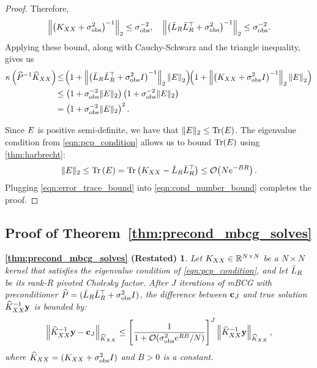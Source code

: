 \begin{proof}
  Therefore,
  \[
    \left\Vert \left(K_{XX} + \sigma^2_\text{obs} \right)^{-1} \right\Vert_2 \leq \sigma^{-2}_\text{obs},
    \quad
    \left\Vert \left(\bar{L}_R \bar{L}_R^\top + \sigma^2_\text{obs} \right)^{-1} \right\Vert_2 \leq \sigma^{-2}_\text{obs}.
  \]
  Applying these bound, along with Cauchy-Schwarz and the triangle inequality, gives us
  \begin{align}
    \kappa \left( \widehat{P}^{-1}\widehat{K}_{XX} \right) \!
    &\leq \! \left( 1 + \left\Vert \left( \bar{L}_R \bar{L}_R^\top + \sigma^2_\text{obs} I \right)^{-1} \right\Vert_2 \left\Vert E \right\Vert_{2} \right)
      \!\!
      \left( 1 + \left\Vert \left( K_{XX} + \sigma^2_\text{obs} I \right)^{-1} \right\Vert_2 \left\Vert E \right\Vert_{2} \right)
    \nonumber \\
    &\leq
    \left( 1 + \sigma^{-2}_\text{obs} \Vert E \Vert_2 \right)
    \left( 1 + \sigma^{-2}_\text{obs} \Vert E \Vert_2 \right)
    \nonumber \\
    &= \left( 1 + \sigma^{-2}_\text{obs} \Vert E \Vert_2 \right)^2.
    \label{eqn:cond_number_bound}
  \end{align}

  Since $E$ is positive semi-definite, we have that $\Vert \bE \Vert_2 \leq \tr{\bE}$.
  The eigenvalue condition from \cref{eqn:pcp_condition} allows us to bound $\tr{\bE}$ using \cref{thm:harbrecht}:
  \begin{equation}
    \Vert \bE \Vert_2 \leq \tr{\bE}
    =
    \tr{ \bK_{\bX\bX} - \bar\bL_R \bar\bL_R^\top } \leq \bigo{N e^{-BR}}.
    \label{eqn:error_trace_bound}
  \end{equation}
  Plugging \cref{eqn:error_trace_bound} into \cref{eqn:cond_number_bound} completes the proof.
\end{proof}




\subsection{Proof of Theorem~\ref{thm:precond_mbcg_solves}}
\newtheorem*{thm:precond_mbcg_solves}{\cref{thm:precond_mbcg_solves} (Restated)}
\begin{thm:precond_mbcg_solves}
  Let $K_{XX} \in \mathbb{R}^{N \times N}$ be a $N \times N$ kernel that satisfies the eigenvalue condition of \cref{eqn:pcp_condition},
	and let $\bar{L}_R$ be its rank-$R$ pivoted Cholesky factor.
	After $J$ iterations of mBCG with preconditioner $\widehat{P} = (\bar{L}_R \bar{L}_R^\top + \sigma_\text{obs}^2 I)$,
	the difference between $\mathbf{c}_J$ and true solution $\widehat{K}_{XX}^{-1} \mathbf{y}$ is bounded by:
  \begin{equation*}
    \left \Vert \trainK^{-1} \by - \bc_{J} \right \Vert_{\trainK}
    \leq \Bigg[ \frac 1 {1 + \bigo{\sigma^{2}_\text{obs} e^{RB}/N}} \Bigg]^{J}
    \left \Vert \trainK^{-1} \by \right \Vert_{\trainK},
		\nonumber
  \end{equation*}
	where $\widehat{K}_{XX} = (K_{XX} + \sigma^2_\text{obs} I)$ and $B > 0$ is a constant.
\end{thm:precond_mbcg_solves}

